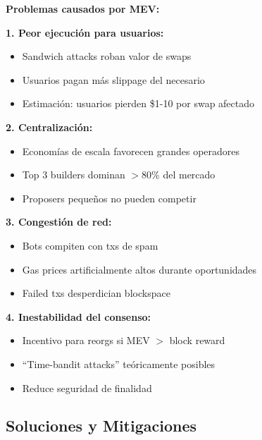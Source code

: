 \documentclass[11pt,a4paper,twoside,openright]{book}
\theoremstyle{definition}
\theoremstyle{plain}
\theoremstyle{remark}
\begin{document}
\begin{advertencia}
\textbf{Problemas causados por MEV:}

\textbf{1. Peor ejecución para usuarios:}
\begin{itemize}
    \item Sandwich attacks roban valor de swaps
    \item Usuarios pagan más slippage del necesario
    \item Estimación: usuarios pierden \$1-10 por swap afectado
\end{itemize}

\textbf{2. Centralización:}
\begin{itemize}
    \item Economías de escala favorecen grandes operadores
    \item Top 3 builders dominan $>$80\% del mercado
    \item Proposers pequeños no pueden competir
\end{itemize}

\textbf{3. Congestión de red:}
\begin{itemize}
    \item Bots compiten con txs de spam
    \item Gas prices artificialmente altos durante oportunidades
    \item Failed txs desperdician blockspace
\end{itemize}

\textbf{4. Inestabilidad del consenso:}
\begin{itemize}
    \item Incentivo para reorgs si MEV $>$ block reward
    \item ``Time-bandit attacks'' teóricamente posibles
    \item Reduce seguridad de finalidad
\end{itemize}
\end{advertencia}

\subsection{Soluciones y Mitigaciones}
\end{document}
